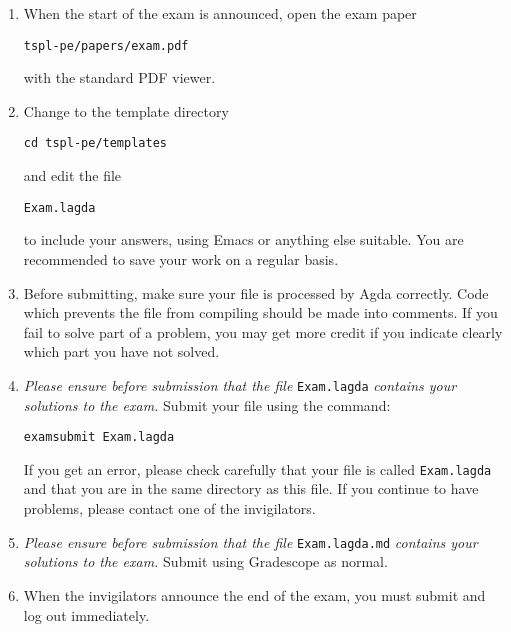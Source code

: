 \documentclass[12pt]{article}
\begin{document}
\begin{enumerate}
{\it (Note that internet access has been disabled.)}

\begin{center}
  \textbf{Do nothing further until the start of the exam is announced!}
\end{center}

\hfill \textit{Please Turn Over}
\newpage

\item When the start of the exam is announced, open the exam paper
\begin{center}
  \texttt{tspl-pe/papers/exam.pdf}
\end{center}
with the standard PDF viewer.

\item Change to the template directory
\begin{center}
  \texttt{cd tspl-pe/templates}
\end{center}
and edit the file
\begin{center}
  \texttt{Exam.lagda}
\end{center}
to include your answers, using Emacs or anything else suitable.
You are recommended to save your work on a regular basis.

\item Before submitting, make sure your file is processed by Agda
  correctly. Code which prevents the file from compiling should be
  made into comments. If you fail to solve part of a problem, you
  may get more credit if you indicate clearly which part you have
  not solved.

\item \emph{Please ensure before submission that the file}
  \texttt{Exam.lagda} \emph{contains your solutions to the exam.}  Submit
  your file using the command:
  \begin{center}
  \texttt{examsubmit Exam.lagda}
  \end{center}
  If you get an error, please check carefully that your file is called
  \texttt{Exam.lagda} and that you are in the same directory as this
  file. If you continue to have problems, please contact one of the
  invigilators.

\item
  \emph{Please ensure before submission that the file}
  \texttt{Exam.lagda.md} \emph{contains your solutions to the exam.}
  Submit using Gradescope as normal.

\item When the invigilators announce the end of the exam, you must
  submit and log out immediately.

\end{enumerate}
\end{document}
